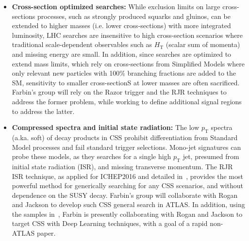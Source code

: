 \begin{itemize}
\item \textbf{Cross-section optimized searches:} While exclusion limits
  on large cross-sections processes, such as strongly produced squarks
  and gluinos, can be extended to higher masses (i.e. lower
  cross-sections) with more integrated luminosity, LHC searches are
  insensitive to high cross-section scenarios where traditional
  scale-dependent observables such as $H_\mathrm{T}$ (scalar sum of
  momenta) and missing energy are small. In addition, since searches
  are optimized to extend mass limits, which rely on cross-sections
  from Simplified Models where only relevant new particles with 100\%
  branching fractions are added to the SM, sensitivity to smaller
  cross-sectionS at lower masses are often sacrificed. Farbin's group
  will rely on the Razor trigger and the RJR techniques to address the
  former problem, while working to define additional signal regions to
  address the latter.

\item \textbf{Compressed spectra and initial state radiation:} The low
  $p_\mathrm{T}$ spectra (a.ka. soft) of decay products in CSS
  prohibit differentiation from Standard Model processes and fail
  standard trigger selections.  Mono-jet signatures can probe these
  models, as they searches for a single high $p_\mathrm{T}$ jet,
  presumed from initial state radiation (ISR), and missing transverse
  momentum. The RJR ISR technique, as applied for ICHEP2016 and
  detailed in~\cite{Jackson:2016mfb}, provides the most powerful
  method for generically searching for any CSS scenarios, and without
  dependence on the SUSY decay. Farbin's group will collaborate with
  Rogan and Jackson to develop such CSS general search in ATLAS. In
  addition, using the samples in~\cite{Jackson:2016mfb}, Farbin is
  presently collaborating with Rogan and Jackson to target CSS with
  Deep Learning techniques, with a goal of a rapid non-ATLAS paper.


\end{itemize}

